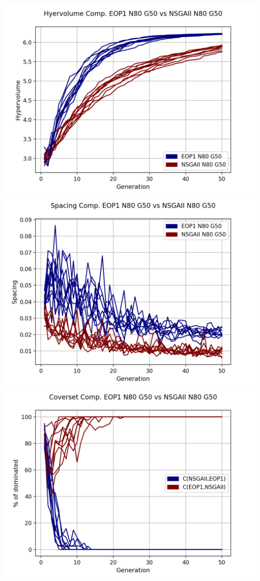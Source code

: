\begin{center}
\includegraphics[scale=0.35]{../METRICS_PLOTS/Hypervol_COMP_EOP1N80G50_NSGAIIN80G50.png}
\includegraphics[scale=0.35]{../METRICS_PLOTS/Spacing_COMP_EOP1N80G50_NSGAIIN80G50.png}
\includegraphics[scale=0.35]{../METRICS_PLOTS/CoverSet_COMP_EOP1N80G50_NSGAIIN80G50.png}\\
\end{center}

